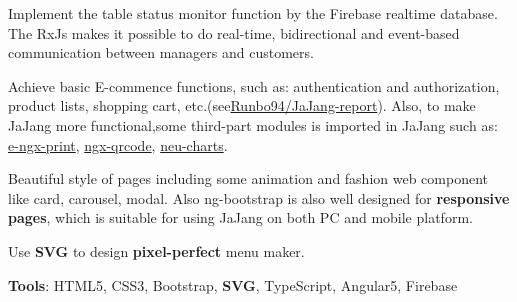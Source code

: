 \documentclass[letterpaper]{deedy-resume} %
\begin{document}
\begin{minipage}[t]{0.33\textwidth} %


\end{minipage} %
\begin{minipage}[t]{1\textwidth} %

\sectionspace %
\vspace{\topsep} %
\begin{tightitemize}
	\item Implement the table status monitor function by the Firebase realtime database. The RxJs makes it possible to do real-time, bidirectional and event-based communication between managers and customers.
	\item Achieve basic E-commence functions, such as: authentication and authorization, product lists, shopping cart, etc.(see\href{https://github.com/Runbo94/JaJang-report}{Runbo94/JaJang-report}). Also, to make JaJang more functional,some third-part modules is imported in JaJang such as: \href{https://github.com/laixiangran/e-ngx-print}{e-ngx-print}, \href{https://github.com/nacardin/ngx-qrcode}{ngx-qrcode},
	\href{https://www.npmjs.com/package/neu-charts}{neu-charts}.
	\item  Beautiful style of pages including some animation and fashion web component like card, carousel, modal. Also ng-bootstrap is also well designed for \textbf{responsive pages}, which is suitable for using JaJang on both PC and mobile platform.
	\item Use \textbf{SVG} to design \textbf{pixel-perfect} menu maker.
	\item \textbf{Tools}: HTML5, CSS3, Bootstrap, \textbf{SVG}, TypeScript, Angular5, Firebase
\end{tightitemize}
\sectionspace %


\end{minipage}
\end{document}
